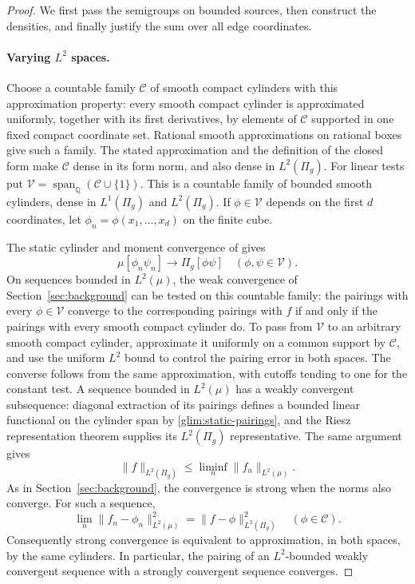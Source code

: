 \begin{proof}
We first pass the semigroups on bounded sources, then construct the
densities, and finally justify the sum over all edge coordinates.

\paragraph{Varying \(L^2\) spaces.}
Choose a countable family \(\mathscr C\) of smooth compact cylinders
with this approximation property: every smooth compact cylinder
is approximated uniformly, together with its first derivatives, by
elements of \(\mathscr C\) supported in one fixed compact coordinate set.
Rational smooth approximations on rational boxes give such a family.
The stated approximation and the definition of the closed form make
\(\mathscr C\) dense in its form norm, and also dense in \(L^2(\Pi_g)\).
For linear tests put
\(\mathscr V=\operatorname{span}_{\mathbb Q}(\mathscr C\cup\{1\})\).
This is a countable family of bounded smooth cylinders, dense in
\(L^1(\Pi_g)\) and \(L^2(\Pi_g)\).  If \(\phi\in\mathscr V\) depends on the
first \(d\) coordinates, let
\(\phi_n=\phi(x_1,\ldots,x_d)\) on the finite cube.

The static cylinder and moment convergence of
\cite[Corollary~3.3]{FUA} gives
\begin{equation}
 \mu[\phi_n\psi_n]\longrightarrow\Pi_g[\phi\psi]
 \quad(\phi,\psi\in\mathscr V).
 \label{glim:static-pairings}
\end{equation}
On sequences bounded in \(L^2(\mu)\), the weak convergence of
Section~\ref{sec:background} can be tested on this countable family:
the pairings with every \(\phi\in\mathscr V\) converge to the
corresponding pairings with \(f\) if and only if the pairings with
every smooth compact cylinder do.  To pass from \(\mathscr V\) to an
arbitrary smooth compact cylinder, approximate it uniformly on a
common support by \(\mathscr C\), and use the uniform \(L^2\) bound
to control the pairing error in both spaces.  The converse follows
from the same approximation, with cutoffs tending to one for the
constant test.
A sequence bounded in \(L^2(\mu)\) has a weakly convergent subsequence:
diagonal extraction of its pairings defines a bounded linear functional
on the cylinder span by \eqref{glim:static-pairings}, and the Riesz
representation theorem supplies its \(L^2(\Pi_g)\) representative.
The same argument gives
\[
 \|f\|_{L^2(\Pi_g)}\le\liminf_n\|f_n\|_{L^2(\mu)}.
\]
As in Section~\ref{sec:background}, the convergence is strong when
the norms also converge.  For such a sequence,
\begin{equation}
 \lim_n\|f_n-\phi_n\|_{L^2(\mu)}^2
       =\|f-\phi\|_{L^2(\Pi_g)}^2
       \quad(\phi\in\mathscr C).
 \label{glim:common-approximation}
\end{equation}
Consequently strong convergence is equivalent to approximation, in both
spaces, by the same cylinders.  In particular, the pairing of an
\(L^2\)-bounded weakly convergent sequence with a strongly convergent
sequence converges.


\end{proof}
